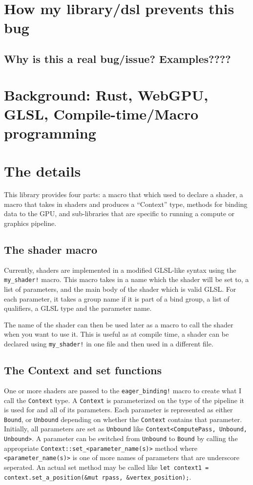\documentclass{article}
\begin{document}
\section{How my library/dsl prevents this bug}
\subsection{Why is this a real bug/issue? Examples????}
\section{Background: Rust, WebGPU, GLSL, Compile-time/Macro programming}
\section{The details}
This library provides four parts: a macro that which used to declare a shader, a macro that takes in shaders and produces a ``Context'' type, methods for binding data to the GPU, and sub-libraries that are specific to running a compute or graphics pipeline.

\subsection{The shader macro}
Currently, shaders are implemented in a modified GLSL-like syntax using the \lstinline{my_shader!} macro. This macro takes in a name which the shader will be set to, a list of parameters, and the main body of the shader which is valid GLSL. For each parameter, it takes a group name if it is part of a bind group, a list of qualifiers, a GLSL type and the parameter name.

The name of the shader can then be used later as a macro to call the shader when you want to use it. This is useful as at compile time, a shader can be declared using \lstinline{my_shader!} in one file and then used in a different file.
\subsection{The Context and set functions}

One or more shaders are passed to the \lstinline{eager_binding!} macro to create what I call the \lstinline{Context} type. A \lstinline{Context} is parameterized on the type of the pipeline it is used for and all of its parameters. Each parameter is represented as either \lstinline{Bound}, or \lstinline{Unbound} depending on whether the \lstinline{Context} contains that parameter. Initially, all parameters are set as \lstinline{Unbound} like \lstinline{Context<ComputePass, Unbound, Unbound>}. A parameter can be switched from \lstinline{Unbound} to \lstinline{Bound} by calling the appropriate \lstinline{Context::set_<parameter_name(s)>} method where \lstinline{<parameter_name(s)>} is one of more names of parameters that are underscore seperated. An actual set method may be called like \lstinline{let context1 = context.set_a_position(&mut rpass, &vertex_position);}.
\end{document}
